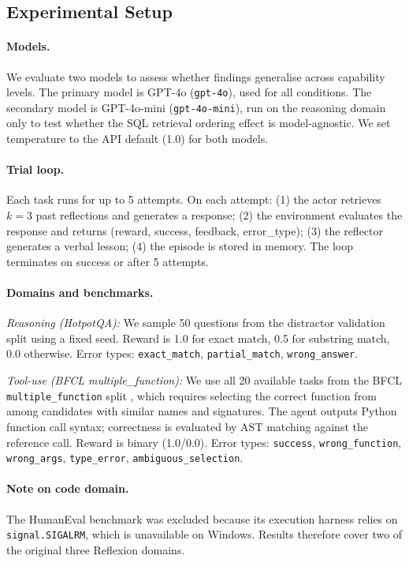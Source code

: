\documentclass{article}
\begin{document}
\subsection{Experimental Setup}

\paragraph{Models.}
We evaluate two models to assess whether findings generalise across capability
levels. The primary model is GPT-4o (\texttt{gpt-4o}), used for all conditions.
The secondary model is GPT-4o-mini (\texttt{gpt-4o-mini}), run on the reasoning
domain only to test whether the SQL retrieval ordering effect is model-agnostic.
We set temperature to the API default (1.0) for both models.

\paragraph{Trial loop.} Each task runs for up to 5 attempts. On each attempt:
(1) the actor retrieves $k{=}3$ past reflections and generates a response;
(2) the environment evaluates the response and returns (reward, success,
feedback, error\_type); (3) the reflector generates a verbal lesson; (4) the
episode is stored in memory. The loop terminates on success or after 5 attempts.

\paragraph{Domains and benchmarks.}

\emph{Reasoning (HotpotQA):} We sample 50 questions from the distractor
validation split using a fixed seed. Reward is 1.0 for exact match, 0.5 for
substring match, 0.0 otherwise. Error types: \texttt{exact\_match},
\texttt{partial\_match}, \texttt{wrong\_answer}.

\emph{Tool-use (BFCL multiple\_function):} We use all 20 available tasks from
the BFCL \texttt{multiple\_function} split \citep{yan2024bfcl}, which requires
selecting the correct function from among candidates with similar names and
signatures. The agent outputs Python function call syntax; correctness is
evaluated by AST matching against the reference call. Reward is binary
(1.0/0.0). Error types: \texttt{success}, \texttt{wrong\_function},
\texttt{wrong\_args}, \texttt{type\_error}, \texttt{ambiguous\_selection}.

\paragraph{Note on code domain.} The HumanEval benchmark \citep{chen2021humaneval}
was excluded because its execution harness relies on \texttt{signal.SIGALRM},
which is unavailable on Windows. Results therefore cover two of the original
three Reflexion domains.
\end{document}
